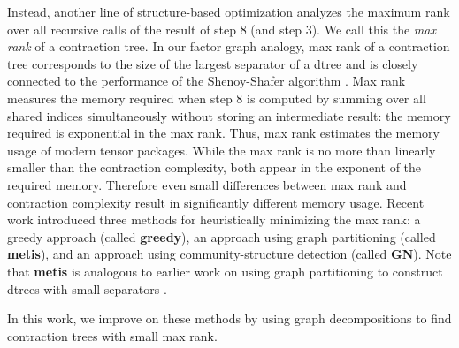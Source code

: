 Instead, another line of structure-based optimization analyzes the maximum rank over all recursive calls of the result of step 8 (and step 3). We call this the \emph{max rank} of a contraction tree. In our factor graph analogy, max rank of a contraction tree corresponds to the size of the largest separator of a dtree \cite{darwiche01b} and is closely connected to the performance of the Shenoy-Shafer algorithm \cite{shenoy97,SS08}. Max rank measures the memory required when step 8 is computed by summing over all shared indices simultaneously without storing an intermediate result: the memory required is exponential in the max rank. Thus, max rank estimates the memory usage of modern tensor packages. While the max rank is no more than linearly smaller than the contraction complexity, both appear in the exponent of the required memory. Therefore even small differences between max rank and contraction complexity result in significantly different memory usage. Recent work \cite{KCMR18} introduced three methods for heuristically minimizing the max rank: a greedy approach (called \textbf{greedy}), an approach using graph partitioning (called \textbf{metis}), and an approach using community-structure detection (called \textbf{GN}). Note that \textbf{metis} is analogous to earlier work on using graph partitioning to construct dtrees with small separators \cite{darwiche01b}.

In this work, we improve on these methods by using graph decompositions to find contraction trees with small max rank.

